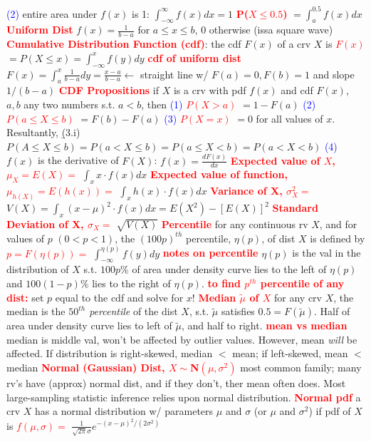 \documentclass[10pt]{extarticle}
\newcommand{\re}[1]{\textcolor{red}{\textbf{#1}}}
\newcommand{\bt}[1]{\textcolor{blue}{#1}}
\begin{document}
	\bt{(2)} entire area under $f(x)$ is 1: $\int_{-\infty}^{\infty}f(x)dx = 1$
	\re{P($X\leq 0.5$)} $= \int_{a}^{0.5}f(x)dx$
	\re{Uniform Dist}
	$f(x)=\frac{1}{b-a}$ for $a\leq x \leq b$, $0$ otherwise (issa square wave)
	\re{Cumulative Distribution Function (cdf)}: the cdf $F(x)$ of a crv $X$ is
	\re{$F(x)$} $=P(X\leq x) = \int_{-\infty}^{x}f(y)dy$
	\re{cdf of uniform dist} $F(x) = \int_{a}^{x}\frac{1}{b-a}dy = \frac{x-a}{b-a} \leftarrow$
	straight line w/ $F(a)=0,F(b)=1$ and slope $1/(b-a)$
	\re{CDF Propositions} if $X$ is a crv with pdf $f(x)$ and cdf $F(x)$, $a,b$ any two numbers
	s.t. $a<b$, then
	\bt{(1)} \re{$P(X>a)$} $= 1-F(a)$
	\bt{(2)} \re{$P(a\leq X\leq b)$} $=F(b) - F(a)$
	\bt{(3)} \re{$P(X=x)$} $=0$ for all values of $x$. Resultantly,
	\b{(3.i)} $P(A\leq X\leq b) = P(a<X\leq b) = P(a\leq X < b) = P(a<X<b)$
	\bt{(4)} $f(x)$ is the derivative of $F(X)$: $f(x) = \frac{dF(x)}{dx}$
	\re{Expected value of $X$, $\mu_{X}=E(X)=$} $\int_{x}x\cdot f(x)dx$
	\re{Expected value of function, $\mu_{h(X)}=E(h(x))=$} $\int_{x}h(x)\cdot f(x)dx$
	\re{Variance of X, $\sigma_{X}^{2}=$} $V(X) = \int_{x}(x-\mu)^{2}\cdot f(x)dx
												= E(X^{2}) - [E(X)]^{2}$
	\re{Standard Deviation of X, $\sigma_{X}=$} $\sqrt{V(X)}$
	\re{Percentile} for any continuous rv $X$, and for values of $p$ $(0<p<1)$, the
	$(100p)^{th}$ percentile, $\eta(p)$, of dist $X$ is defined by
	\re{$p = F(\eta(p))=$} $\int_{-\infty}^{\eta(p)}f(y)dy$
	\re{notes on percentile} $\eta(p)$ is the val in the distribution of $X$ s.t.
	$100p\%$ of area under density curve lies to the left of $\eta(p)$ and
	$100(1-p)\%$ lies to the right of $\eta(p)$.
	\re{to find $p^{th}$ percentile of any dist:} set $p$ equal to the cdf and solve
	for $x$!
	\re{Median $\tilde\mu$ of $X$} for any crv $X$, the median is the \emph{$50^{th}$
	percentile} of the dist $X$, s.t. $\tilde\mu$ satisfies $0.5=F(\tilde\mu)$. Half
	of area under density curve lies to left of $\tilde\mu$, and half to right.
	\re{mean vs median} median is middle val, won't be affected by outlier values.
	However, mean \emph{will} be affected. If distribution is right-skewed,
	median $<$ mean; if left-skewed, mean $<$ median
	\re{Normal (Gaussian) Dist, $X\mathtt{\sim}$N$(\mu,\sigma^{2})$} most common family; many rv's have (approx) normal dist,
	and if they don't, ther mean often does. Most large-sampling statistic inference
	relies upon normal distribution.
	\re{Normal pdf} a crv $X$ has a normal distribution w/ parameters $\mu$ and $\sigma$
	(or $\mu$ and $\sigma^{2}$) if pdf of $X$ is
	\re{$f(\mu,\sigma)=$} $\frac{1}{\sqrt{2\pi}\sigma}e^{-(x-\mu)^{2}/(2\sigma^{2})}$
\end{document}
